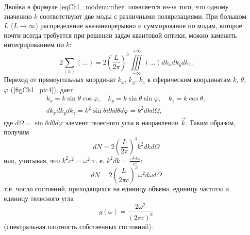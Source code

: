 Двойка в формуле \eqref{eqCh1_modenumber} появляется из-за того, что
одному значению  $k$  соответствуют две моды с различными
поляризациями. При большом $L$ ($L\rightarrow \infty$)  распределение
квазинепрерывно и суммирование по модам,
которое почти всегда требуется при решении задач квантовой оптики,
можно заменить интегрированием
по $k$: 
\begin{equation}
2 \sum_{(n)} \left( \dots \right) = 2 \left(\frac{L}{2 \pi} \right)^3
\iiint\limits_{-\infty}^{+\infty} \left( \dots \right) d k_x d k_y d k_z.
\label{eqCh1_modenumber_kvazy_contig}
\end{equation}
Переход от прямоугольных координат  $k_x$,  $k_y$, $k_z$   к сферическим координатам  
$k$, $\theta$, $\varphi$    (\autoref{figCh1_pic4}), дает
\begin{eqnarray}
k_x = k \sin \theta \cos \varphi,
\quad 
k_y = k \sin \theta \sin \varphi,
\quad 
k_z  = k \cos \theta,
\nonumber \\
d k_x d k_y d k_z = k^2 \sin \theta d k d \theta d \varphi = k^2 d k
d \Omega,
\end{eqnarray}
где $d \Omega = \sin \theta d \theta d \varphi$ элемент телесного угла в
направлении  $\vec{k}$.  Таким образом, получим
\begin{equation}
d N = 2 \left(\frac{L}{2 \pi} \right)^3 k^2 d k d \Omega
\label{eqCh1_modenumber_1pre}
\end{equation}
или, учитывая, что $k^2 c^2 = \omega^2$ т. е. $k^2 d k =
\frac{\omega^2 d \omega}{c^3}$: 
\begin{equation}
d N = 2 \left(\frac{L}{2 \pi c} \right)^3 \omega^2 d \omega d \Omega
\label{eqCh1_modenumber_1}
\end{equation}
т.е. число состояний, приходящихся на единицу объема, единицу частоты и единицу телесного угла
\begin{equation}
g\left(\omega\right)  = \frac{2 \omega^2}{\left(2 \pi c\right)^3}
\end{equation}
(спектральная плотность собственных состояний). 
